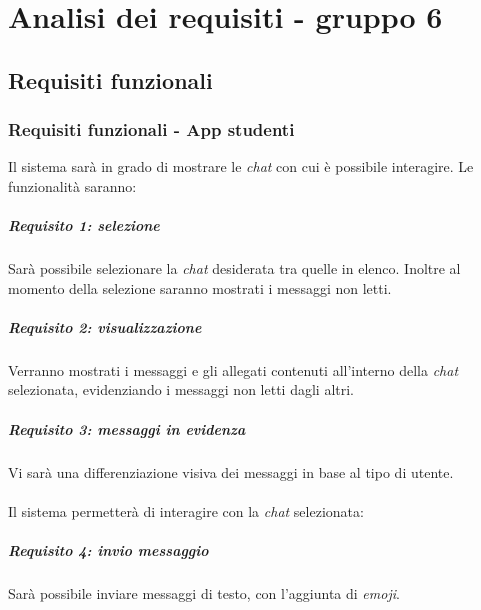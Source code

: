 
\chapter{Analisi dei requisiti - gruppo 6}
\label{ref:requisiti6}


\section{Requisiti funzionali}

\subsection{Requisiti  funzionali - App studenti}
Il sistema sarà in grado di mostrare le \emph{chat} con cui è possibile interagire. Le funzionalità saranno:

\paragraph{Requisito 1: selezione\\} 
Sarà possibile selezionare la \emph{chat} desiderata tra quelle in elenco. Inoltre al momento della selezione saranno mostrati i messaggi non letti.

\paragraph{Requisito 2: visualizzazione\\}
Verranno mostrati i messaggi e gli allegati contenuti all’interno della \emph{chat} selezionata, evidenziando i messaggi non letti dagli altri.

\paragraph{Requisito 3: messaggi in evidenza\\}
Vi sarà una differenziazione visiva dei messaggi in base al tipo di utente.\\
\\
Il sistema permetterà di interagire con la \emph{chat} selezionata:

\paragraph{Requisito 4: invio messaggio\\}
Sarà possibile inviare messaggi di testo, con l’aggiunta di \emph{emoji}.

